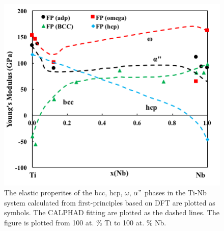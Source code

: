 \pagebreak
\begin{figure}[H]
	\centering
	\includegraphics[width=\textwidth]{Chapter-7/Figures/tinbelastic.png}
	\caption{The elastic properites of the bcc, hcp, $\omega$, $\alpha"$ phases in the Ti-Nb system calculated from first-principles based on DFT are plotted as symbols. The CALPHAD fitting are plotted as the dashed lines. The figure is plotted from 100 at. \% Ti to 100 at. \% Nb.}
	\label{Ch7-figure:tinbelastic}
\end{figure}

